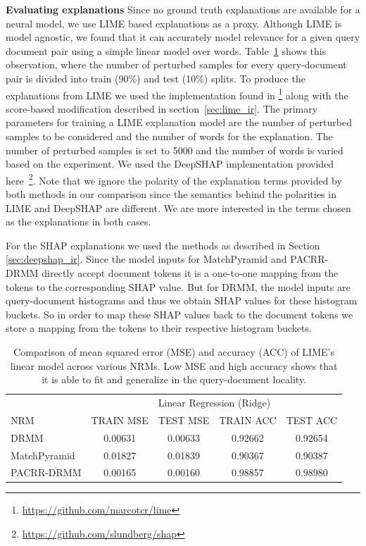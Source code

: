\textbf{Evaluating explanations} Since no ground truth explanations are available for a neural model, we use LIME based explanations as a proxy. Although LIME is model agnostic, we found that it can accurately model relevance for a given query document pair using a simple linear model over words. Table~\ref{tab:lime_model_performances} shows this observation, where the number of perturbed samples for every query-document pair is divided into train (90\%) and test (10\%) splits. To produce the explanations from LIME we used the implementation found in \footnote{\url{https://github.com/marcotcr/lime}} along with the score-based modification described in section~\ref{sec:lime_ir}. The primary parameters for training a LIME explanation model are the number of perturbed samples to be considered and the number of words for the explanation. The number of perturbed samples is set to 5000 and the number of words is varied based on the experiment. We used the DeepSHAP implementation provided here~\footnote{\url{https://github.com/slundberg/shap}}. Note that we ignore the polarity of the explanation terms provided by both methods in our comparison since the semantics behind the polarities in LIME and DeepSHAP are different. We are more interested in the terms chosen as the explanations in both cases.

For the SHAP explanations we used the methods as described in Section \ref{sec:deepshap_ir}. Since the model inputs for MatchPyramid and PACRR-DRMM directly accept document tokens it is a one-to-one mapping from the tokens to the corresponding SHAP value. But for DRMM, the model inputs are query-document histograms and thus we obtain SHAP values for these histogram buckets. So in order to map these SHAP values back to the document tokens we store a mapping from the tokens to their respective histogram buckets.

\begin{table}
\centering
\begin{tabular}{lcccc} 
 \toprule
 &\multicolumn{4}{c}{Linear Regression (Ridge)}\\
 NRM & TRAIN MSE & TEST MSE & TRAIN ACC & TEST ACC\\
 \midrule
 DRMM & 0.00631 & 0.00633 & 0.92662 & 0.92654\\
 MatchPyramid & 0.01827 & 0.01839 & 0.90367 & 0.90387\\
 PACRR-DRMM & 0.00165 & 0.00160 & 0.98857 & 0.98980\\
\bottomrule
\end{tabular}
\footnotesize
\caption[Evaluation of LIME's linear model performance metrics across various NRMs.]{Comparison of mean squared error (MSE) and accuracy (ACC) of LIME's linear model across various NRMs. Low MSE and high accuracy shows that it is able to fit and generalize in the query-document locality.}
\label{tab:lime_model_performances}
\end{table}


